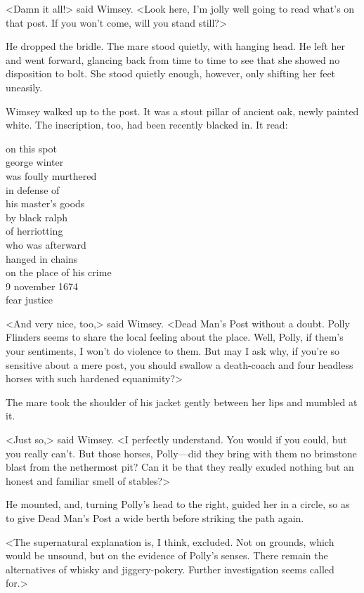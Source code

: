 <Damn it all!> said Wimsey. <Look here, I'm jolly well going to read what's on that post. If you won't come, will you stand still?>

He dropped the bridle. The mare stood quietly, with hanging head. He left her and went forward, glancing back from time to time to see that she showed no disposition to bolt. She stood quietly enough, however, only shifting her feet uneasily.

Wimsey walked up to the post. It was a stout pillar of ancient oak, newly painted white. The inscription, too, had been recently blacked in. It read:

\begin{center}\oldfontsc
	\label{post}
on this spot\\
george winter\\
was foully murthered\\
in defense of\\
his master's goods\\
by black ralph\\
of herriotting\\
who was afterward\\
hanged in chains\\
on the place of his crime\\
9 november 1674\\
\bigskip
fear justice
\end{center}

<And very nice, too,> said Wimsey. <Dead Man's Post without a doubt. Polly Flinders seems to share the local feeling about the place. Well, Polly, if them's your sentiments, I won't do violence to them. But may I ask why, if you're so sensitive about a mere post, you should swallow a death-coach and four headless horses with such hardened equanimity?>

The mare took the shoulder of his jacket gently between her lips and mumbled at it.

<Just so,> said Wimsey. <I perfectly understand. You would if you could, but you really can't. But those horses, Polly—did they bring with them no brimstone blast from the nethermost pit? Can it be that they really exuded nothing but an honest and familiar smell of stables?>

He mounted, and, turning Polly's head to the right, guided her in a circle, so as to give Dead Man's Post a wide berth before striking the path again.

<The supernatural explanation is, I think, excluded. Not on  grounds, which would be unsound, but on the evidence of Polly's senses. There remain the alternatives of whisky and jiggery-pokery. Further investigation seems called for.>

